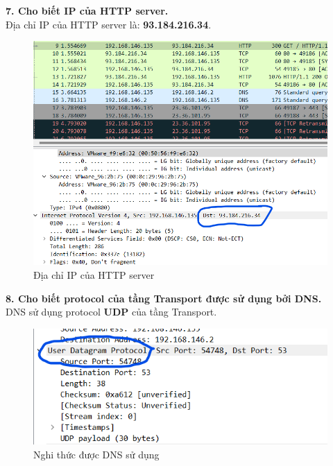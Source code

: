 \textbf{7.	Cho biết IP của HTTP server.}\\
Địa chỉ IP của HTTP server là: \textbf{93.184.216.34}.
\begin{figure}[H]
\begin{center}
\includegraphics[scale=1]{../figures/p2/p2_httpserverip}
\end{center}
\caption{Địa chỉ IP của HTTP server}
\end{figure}

\textbf{8.	Cho biết protocol của tầng Transport được sử dụng bởi DNS.}\\
DNS sử dụng protocol \textbf{UDP} của tầng Transport.
\begin{figure}[H]
\begin{center}
\includegraphics[scale=1]{../figures/p2/p2_dnsprotocol}
\end{center}
\caption{Nghi thức được DNS sử dụng}
\end{figure}

